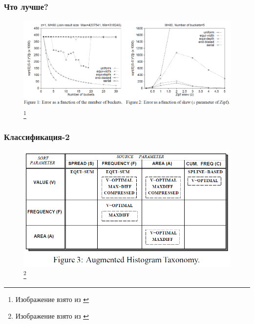 \documentclass{beamer}
\begin{document}
\begin{frame}
\frametitle{Что лучше?}

\begin{figure}[htb]
\includegraphics[width=\textwidth,height=0.65\textheight,keepaspectratio]{test.png} 
\footnote{\tiny{Изображение взято из \cite{Ioannidis1995}}}
\end{figure}

\end{frame}

\begin{frame}
\frametitle{Классификация-2}

\begin{figure}[htb]
\includegraphics[width=\textwidth,height=0.65\textheight,keepaspectratio]{taxonomy-2.png} 
\footnote{\tiny{Изображение взято из \cite{Poosala1996}}}
\end{figure}

\end{frame}
\end{document}
